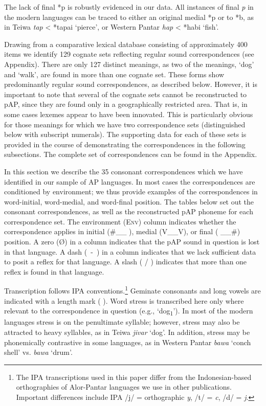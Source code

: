 The lack of final *p is robustly evidenced in our data. All instances of final \textit{p }in the modern languages can be traced to either an original medial *p or to *b, as in Teiwa \textit{tap }{\textless} *tapai `pierce', or Western Pantar \textit{hap} {\textless} *habi `fish'. 

 Drawing from a comparative lexical database consisting of approximately 400 items we identify 129 cognate sets reflecting regular sound correspondences (see Appendix). There are only 127 distinct meanings, as two of the meanings, `dog' and `walk', are found in more than one cognate set. These forms show predominantly regular sound correspondences, as described below. However, it is important to note that several of the cognate sets cannot be reconstructed to pAP, since they are found only in a geographically restricted area. That is, in some cases lexemes appear to have been innovated. This is particularly obvious for those meanings for which we have two correspondence sets (distinguished below with subscript numerals). The supporting data for each of these sets is provided in the course of demonstrating the correspondences in the following subsections. The complete set of correspondences can be found in the Appendix. 

In this section we describe the 35 consonant correspondences which we have identified in our sample of AP languages. In most cases the correspondences are conditioned by environment; we thus provide examples of the correspondences in word-initial, word-medial, and word-final position. The tables below set out the consonant correspondences, as well as the reconstructed pAP phoneme for each correspondence set. The environment (\textsc{Env}) column indicates whether the correspondence applies in initial (\#\_\_ ), medial (V\_\_V), or final ( \_\_\#) position. A zero ({\O}) in a column indicates that the pAP sound in question is lost in that language. A dash (~-~) in a column indicates that we lack sufficient data to posit a reflex for that language. A slash ( / ) indicates that more than one reflex is found in that language. 

Transcription follows IPA conventions.\footnote{ The IPA transcriptions used in this paper differ from the Indonesian-based orthographies of Alor-Pantar languages we use in other publications. Important differences include IPA /j/ = orthographic \textit{y}, /t{\textesh}/ = \textit{c}, /d{\textyogh}/ = \textit{j}.} Geminate consonants and long vowels are indicated with a length mark ( {\textlengthmark} ). Word stress is transcribed here only where relevant to the correspondence in question (e.g., `dog\textsubscript{1}'). In most of the modern languages stress is on the penultimate syllable; however, stress may also be attracted to heavy syllables, as in Teiwa \textit{ji{\textprimstress}var} `dog'. In addition, stress may be phonemically contrastive in some languages, as in Western Pantar \textit{ba}\textit{{\textprimstress}}\textit{wa} `conch shell' vs. \textit{{\textprimstress}}\textit{bawa} `drum'.

